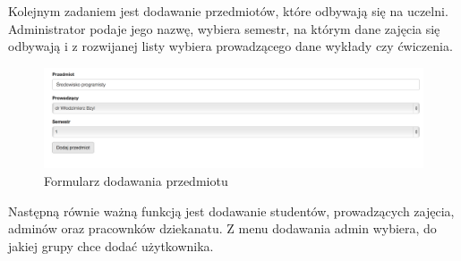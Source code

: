 \documentclass{xmgr}
\begin{document}
\noindent Kolejnym zadaniem jest dodawanie przedmiotów, które odbywają się na uczelni. Administrator podaje jego nazwę, wybiera semestr, na którym dane zajęcia się odbywają i z rozwijanej listy wybiera prowadzącego dane wykłady czy ćwiczenia.

\begin{figure}[th!]
\centering
\includegraphics[width=1.1\hsize]{images/addSubject}
\caption{Formularz dodawania przedmiotu\label{RYS.6}}
\end{figure}

\noindent Następną równie ważną funkcją jest dodawanie studentów, prowadzących zajęcia, adminów oraz pracownków dziekanatu. Z menu dodawania admin wybiera, do jakiej grupy chce dodać użytkownika.
\end{document}
